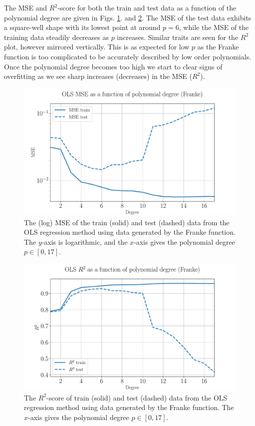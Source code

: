 \documentclass[%
reprint,
amsmath,amssymb,
aps,
pra,
]{revtex4-2}
\begin{document}
The MSE and $R^2$-score for both the train and test data as a function of the polynomial degree are given in Figs. \ref{fig:OLS_mse_degree}. and \ref{fig:OLS_r2_degree}. The MSE of the test data exhibits a square-well shape with its lowest point at around \(p=6\), while the MSE of the training data steadily decreases as \(p\) increases. Similar traits are seen for the $R^2$ plot, however mirrored vertically. This is as expected for low $p$ as the Franke function is too complicated to be accurately described by low order polynomials. Once the polynomial degree becomes too high we start to clear signs of overfitting as we see sharp increases (decreases) in the MSE ($R^2$). 
\begin{figure}[ht!]
	\centering
	\includegraphics[width=\linewidth]{Python/Figures/OLS/OLS_MSE_Unscaled.pdf}
	\caption{The (log) MSE of the train (solid) and test (dashed) data from the OLS regression method using data generated by the Franke function. The $y$-axis is logarithmic, and the $x$-axis gives the polynomial degree \(p\in[0,17]\).}
	\label{fig:OLS_mse_degree}
\end{figure}
\begin{figure}[ht!]
	\centering
	\includegraphics[width=\linewidth]{Python/Figures/OLS/OLS_R2_Unscaled.pdf}
	\caption{The \(R^2\)-score of train (solid) and test (dashed) data from the OLS regression method using data generated by the Franke function. The $x$-axis gives the polynomial degree \(p\in[0,17]\).}
	\label{fig:OLS_r2_degree}
\end{figure}
\end{document}

